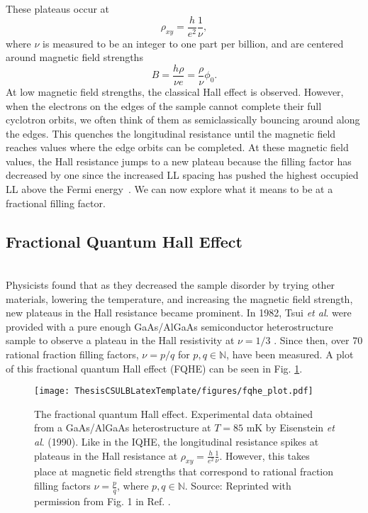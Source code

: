             These plateaus occur at
            \begin{equation} \label{iqhePlat}
            \rho_{xy}=\frac{h}{e^2}\frac{1}{\nu},
            \end{equation}
            where $\nu$ is measured to be an integer to one part per billion, and are centered around magnetic field strengths
            \begin{equation} \label{magFieldIqhe}
            B=\frac{h\rho}{\nu e}=\frac{\rho}{\nu}\phi_0.
            \end{equation}
            At low magnetic field strengths, the classical Hall effect is observed. However, when the electrons on the edges of the sample cannot complete their full cyclotron orbits, we often think of them as semiclassically bouncing around along the edges. This quenches the longitudinal resistance until the magnetic field reaches values where the edge orbits can be completed. At these magnetic field values, the Hall resistance jumps to a new plateau because the filling factor has decreased by one since the increased LL spacing has pushed the highest occupied LL above the Fermi energy~\cite{tong}. We can now explore what it means to be at a fractional filling factor.

        \subsection{Fractional Quantum Hall Effect}\label{ssec:fractQuantHallEff}\\
		
            Physicists found that as they decreased the sample disorder by trying other materials, lowering the temperature, and increasing the magnetic field strength, new plateaus in the Hall resistance became prominent. In 1982, Tsui \textit{et al}. were provided with a pure enough GaAs/AlGaAs semiconductor heterostructure sample to observe a plateau in the Hall resistivity at $\nu=1/3$ \cite{tsui}. Since then, over 70 rational fraction filling factors, $\nu=p/q$ for $p,q\in\mathbb{N}$, have been measured. A plot of this fractional quantum Hall effect (FQHE) can be seen in Fig. \ref{fqhePlot}.
		
		\begin{figure}[H]
            \begin{center}
            \texttt{[image: ThesisCSULBLatexTemplate/figures/fqhe\_plot.pdf]}
            \caption[The fractional quantum Hall effect.]{The fractional quantum Hall effect. Experimental data obtained from a GaAs/AlGaAs heterostructure at $T=85$ mK by Eisenstein \textit{et al}. (1990). Like in the IQHE, the longitudinal resistance spikes at plateaus in the Hall resistance at $\rho_{xy}=\frac{h}{e^2}\frac{1}{\nu}$. However, this takes place at magnetic field strengths that correspond to rational fraction filling factors $\nu=\frac{p}{q}$, where $p,q\in\mathbb{N}$. Source: Reprinted with permission from Fig. 1 in Ref. \cite{stormer}.} 
            \label{fqhePlot}
            \end{center}
            \end{figure}
            
